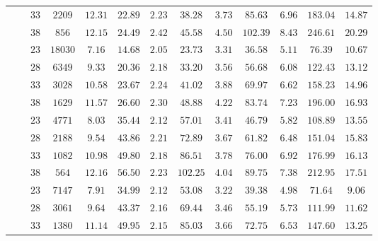 \begin{table}[t]
\begin{center}
\begin{tabular}{c|c|c|c|c|c|c|c|c|c|c|c|c}
			& & $33$ & $2209$ & $12.31$ & $22.89$ & $2.23$ & $38.28$ & $3.73$ & $85.63$ & $6.96$ & $183.04$ & $14.87$ \\
			& & $38$ & $856$ & $12.15$ & $24.49$ & $2.42$ & $45.58$ & $4.50$ & $102.39$ & $8.43$ & $246.61$ & $20.29$ \\
			&  &
			$23$ & $18030$ & $7.16$ & $14.68$ & $2.05$ & $23.73$ & $3.31$ & $36.58$ & $5.11$ & $76.39$ & $10.67$ \\
			& & $28$ & $6349$ & $9.33$ & $20.36$ & $2.18$ & $33.20$ & $3.56$ & $56.68$ & $6.08$ & $122.43$ & $13.12$ \\
			& & $33$ & $3028$ & $10.58$ & $23.67$ & $2.24$ & $41.02$ & $3.88$ & $69.97$ & $6.62$ & $158.23$ & $14.96$ \\
			& & $38$ & $1629$ & $11.57$ & $26.60$ & $2.30$ & $48.88$ & $4.22$ & $83.74$ & $7.23$ & $196.00$ & $16.93$ \\
			&  &
			$23$ & $4771$ & $8.03$ & $35.44$ & $2.12$ & $57.01$ & $3.41$ & $46.79$ & $5.82$ & $108.89$ & $13.55$ \\
			& & $28$ & $2188$ & $9.54$ & $43.86$ & $2.21$ & $72.89$ & $3.67$ & $61.82$ & $6.48$ & $151.04$ & $15.83$ \\
			& & $33$ & $1082$ & $10.98$ & $49.80$ & $2.18$ & $86.51$ & $3.78$ & $76.00$ & $6.92$ & $176.99$ & $16.13$ \\
			& & $38$ & $564$ & $12.16$ & $56.50$ & $2.23$ & $102.25$ & $4.04$ & $89.75$ & $7.38$ & $212.95$ & $17.51$ \\
			&  &
			$23$ & $7147$ & $7.91$ & $34.99$ & $2.12$ & $53.08$ & $3.22$ & $39.38$ & $4.98$ & $71.64$ & $9.06$ \\
			& & $28$ & $3061$ & $9.64$ & $43.37$ & $2.16$ & $69.44$ & $3.46$ & $55.19$ & $5.73$ & $111.99$ & $11.62$ \\
			& & $33$ & $1380$ & $11.14$ & $49.95$ & $2.15$ & $85.03$ & $3.66$ & $72.75$ & $6.53$ & $147.60$ & $13.25$ \\

\end{tabular}
\end{center}
\end{table}
